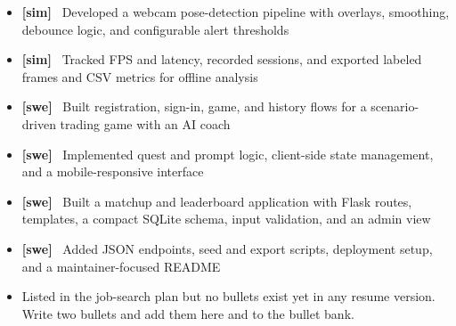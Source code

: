 \documentclass[10pt,letterpaper]{article}
\newcommand{\vtag}[1]{\textbf{[#1]}~}
\begin{document}
\entryspace

\begin{itemize}
  \item \vtag{sim} Developed a webcam pose-detection pipeline with overlays, smoothing, debounce logic, and configurable alert thresholds
  \item \vtag{sim} Tracked FPS and latency, recorded sessions, and exported labeled frames and CSV metrics for offline analysis
\end{itemize}

\entryspace

\begin{itemize}
  \item \vtag{swe} Built registration, sign-in, game, and history flows for a scenario-driven trading game with an AI coach
  \item \vtag{swe} Implemented quest and prompt logic, client-side state management, and a mobile-responsive interface
\end{itemize}

\entryspace

\begin{itemize}
  \item \vtag{swe} Built a matchup and leaderboard application with Flask routes, templates, a compact SQLite schema, input validation, and an admin view
  \item \vtag{swe} Added JSON endpoints, seed and export scripts, deployment setup, and a maintainer-focused README
\end{itemize}

\entryspace

\begin{itemize}
  \item Listed in the job-search plan but no bullets exist yet in any resume version. Write two bullets and add them here and to the bullet bank.
\end{itemize}
\end{document}
